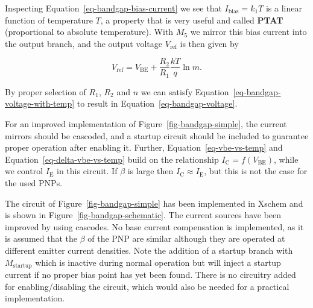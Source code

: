 \documentclass[
  a4paper,
  DIV=11,
  numbers=noendperiod]{scrartcl}
\begin{document}
Inspecting Equation~\ref{eq-bandgap-bias-current} we see that
\(I_\mathrm{bias} = k_1 T\) is a linear function of temperature \(T\), a
property that is very useful and called \textbf{PTAT} (proportional to
absolute temperature). With \(M_5\) we mirror this bias current into the
output branch, and the output voltage \(V_\mathrm{ref}\) is then given
by

\[
V_\mathrm{ref} = V_\mathrm{BE}+ \frac{R_2}{R_1} \frac{k T}{q} \ln m.  
\]

By proper selection of \(R_1\), \(R_2\) and \(n\) we can satisfy
Equation~\ref{eq-bandgap-voltage-with-temp} to result in
Equation~\ref{eq-bandgap-voltage}.

\begin{tcolorbox}[enhanced jigsaw, toprule=.15mm, titlerule=0mm, left=2mm, leftrule=.75mm, toptitle=1mm, breakable, colframe=quarto-callout-note-color-frame, colback=white, colbacktitle=quarto-callout-note-color!10!white, opacityback=0, arc=.35mm, coltitle=black, bottomtitle=1mm, title=\textcolor{quarto-callout-note-color}{\faInfo}\hspace{0.5em}{Improved Bandgap Reference}, bottomrule=.15mm, rightrule=.15mm, opacitybacktitle=0.6]

For an improved implementation of Figure~\ref{fig-bandgap-simple}, the
current mirrors should be cascoded, and a startup circuit should be
included to guarantee proper operation after enabling it. Further,
Equation~\ref{eq-vbe-vs-temp} and Equation~\ref{eq-delta-vbe-vs-temp}
build on the relationship \(I_\mathrm{C} = f(V_\mathrm{BE})\), while we
control \(I_\mathrm{E}\) in this circuit. If \(\beta\) is large then
\(I_\mathrm{C} \approx I_\mathrm{E}\), but this is not the case for the
used PNPs.

\end{tcolorbox}

The circuit of Figure~\ref{fig-bandgap-simple} has been implemented in
Xschem and is shown in Figure~\ref{fig-bandgap-schematic}. The current
sources have been improved by using cascodes. No base current
compensation is implemented, as it is assumed that the \(\beta\) of the
PNP are similar although they are operated at different emitter current
densities. Note the addition of a startup branch with
\(M_\mathrm{startup}\) which is inactive during normal operation but
will inject a startup current if no proper bias point has yet been
found. There is no circuitry added for enabling/disabling the circuit,
which would also be needed for a practical implementation.
\end{document}

